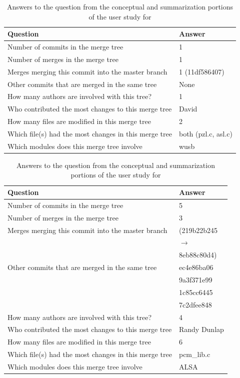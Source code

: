 \begin{table}[htpb]
  \centering
  \caption{Answers to the question from the conceptual and summarization portions of the user study for \comA}
  \label{tab:coma_study_answers}
  \begin{tabular}{l|l}
    Question                                              & Answer \\\hline\hline
    Number of commits in the merge tree                   & 1\\
    Number of merges in the merge tree                    & 1\\\hline
    Merges merging this commit into the master branch     & 1 (11df586407)\\
    Other commits that are merged in the same tree        & None\\
    How many authors are involved with this tree?         & 1\\
    Who contributed the most changes to this merge tree   & David\\
    How many files are modified in this merge tree        & 2\\
    Which file(s) had the most changes in this merge tree & both (pzl.c, asl.c)\\
    Which modules does this merge tree involve & wusb
  \end{tabular}
\end{table}


\begin{table}[htpb]
  \centering
  \caption{Answers to the question from the conceptual and summarization portions of the user study for \comB}
  \label{tab:comb_study_answers}
  \begin{tabular}{l|l}
    Question & Answer \\\hline\hline
    Number of commits in the merge tree & 5 \\
    Number of merges in the merge tree & 3\\\hline
    Merges merging this commit into the master branch     & (219b22b245
    \\
    & $\rightarrow$ \\
    & 8eb88c80d4)\\
    Other commits that are merged in the same tree        & ec4e86ba06\\
    & 9a3f371e99\\
    & 1c85cc6445\\
    & 7c2dfee848\\
    How many authors are involved with this tree?         & 4\\
    Who contributed the most changes to this merge tree   & Randy Dunlap\\
    How many files are modified in this merge tree        & 6\\
    Which file(s) had the most changes in this merge tree & pcm\_lib.c\\
    Which modules does this merge tree involve            & ALSA\\
  \end{tabular}
\end{table}

